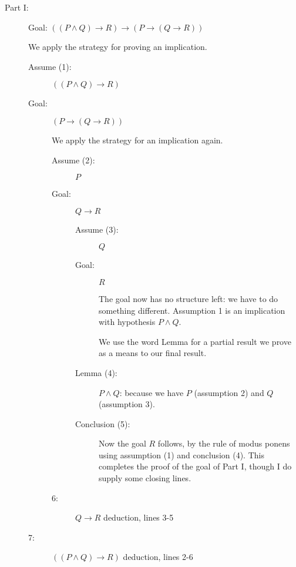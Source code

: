 \documentclass[12pt]{article}
\begin{document}
\begin{description}

\item[Part I:]  Goal:  $((P \wedge Q) \rightarrow R) \rightarrow (P \rightarrow (Q
\rightarrow R))$

We apply the strategy for proving an implication.

\begin{description}

\item[Assume (1):]  $((P \wedge Q) \rightarrow R)$

\item[Goal:]  $(P \rightarrow (Q\rightarrow R))$

We apply the strategy for an implication again.

\begin{description}

\item[Assume (2):]  $P$

\item[Goal:]  $Q \rightarrow R$

\begin{description}

\item[Assume (3):]  $Q$

\item[Goal:]  $R$

The goal now has no structure left:  we have to do something different.
Assumption 1 is an implication with hypothesis $P \wedge Q$.

We use the word Lemma for a partial result we prove as a means to our
final result.

\item[Lemma (4):] $P \wedge Q$: because we have $P$ (assumption
2) and $Q$ (assumption 3).

\item[Conclusion (5):]  Now the goal $R$ follows, by the rule of modus ponens using assumption
(1) and conclusion (4).  This completes the proof of the goal of Part I, though I do supply some closing lines.

\end{description}

\item[6:]  $Q \rightarrow R$  deduction, lines 3-5

\end{description}

\item[7:]  $((P \wedge Q) \rightarrow R)$ deduction, lines 2-6



\end{description}
\end{description}
\end{document}
